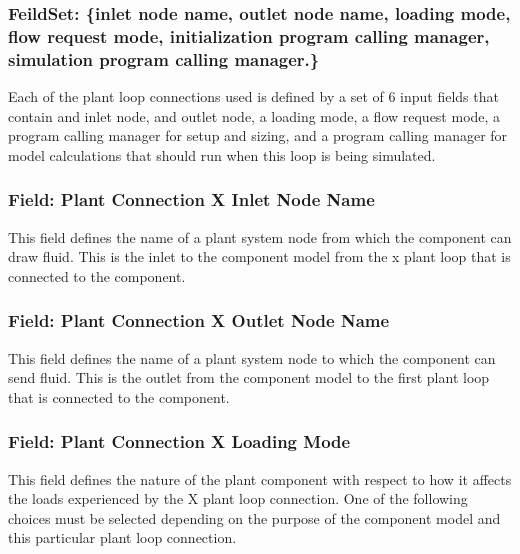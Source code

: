 \subsubsection{FeildSet: \{inlet node name, outlet node name, loading mode, flow request mode, initialization program calling manager, simulation program calling manager.\}}\label{feildset-inlet-node-name-outlet-node-name-loading-mode-flow-request-mode-initialization-program-calling-manager-simulation-program-calling-manager.}

Each of the plant loop connections used is defined by a set of 6 input fields that contain and inlet node, and outlet node, a loading mode, a flow request mode, a program calling manager for setup and sizing, and a program calling manager for model calculations that should run when this loop is being simulated.

\subsubsection{Field: Plant Connection X Inlet Node Name}\label{field-plant-connection-x-inlet-node-name}

This field defines the name of a plant system node from which the component can draw fluid. This is the inlet to the component model from the x plant loop that is connected to the component.

\subsubsection{Field: Plant Connection X Outlet Node Name}\label{field-plant-connection-x-outlet-node-name}

This field defines the name of a plant system node to which the component can send fluid. This is the outlet from the component model to the first plant loop that is connected to the component.

\subsubsection{Field: Plant Connection X Loading Mode}\label{field-plant-connection-x-loading-mode}

This field defines the nature of the plant component with respect to how it affects the loads experienced by the X plant loop connection. One of the following choices must be selected depending on the purpose of the component model and this particular plant loop connection.


